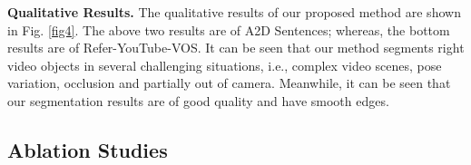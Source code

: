 \documentclass[sigconf]{acmart}
\begin{document}
{\textbf{Qualitative Results.}} The qualitative results of our proposed method are shown in Fig. \ref{fig4}. The above two results are of A2D Sentences; whereas, the bottom results are of Refer-YouTube-VOS. It can be seen that our method segments right video objects in several challenging situations, i.e., complex video scenes, pose variation, occlusion and partially out of camera. Meanwhile, it can be seen that our segmentation results are of good quality and have smooth edges.

\subsection{Ablation Studies}

\begin{table}[t]
\centering
{}
\caption{Comparison with the state-of-the-art methods on Refer-YouTube-VOS.}
\label{Table3}
\end{table}

\begin{table}[t]
\centering
{}
\caption{The results of ablation studies on A2D Sentence to discuss on the effectiveness of dual-path dual-attention module.}
\label{Table4}
\end{table}
\end{document}
